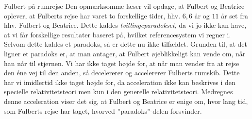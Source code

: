 \begin{opgave}{Fulbert på rumrejse}
    Den opmærksomme læser vil opdage, at Fulbert og Beatrice oplever, at Fulberts rejse har varet to forskellige tider, hhv. $6,6$ år og $11$ år set fra hhv. Fulbert og Beatrice. Dette kaldes \emph{tvillingeparadokset}, da vi jo ikke kan have, at vi får forskellige resultater baseret på, hvilket referencesystem vi regner i. Selvom dette kaldes et paradoks, så er dette nu ikke tilfældet. Grunden til, at det ligner et paradoks er, at man antager, at Fulbert øjeblikkeligt kan vende om, når han når til stjernen. Vi har ikke taget højde for, at når man vender fra at rejse den éne vej til den anden, så decelererer og accelererer Fulberts rumskib. Dette har vi imidlertid ikke taget højde for, da acceleration ikke kan beskrives i den specielle relativitetsteori men kun i den generelle relativitetsteori. Medregnes denne acceleration viser det sig, at Fulbert og Beatrice er enige om, hvor lang tid, som Fulberts rejse har taget, hvorved ''paradoks''-delen forsvinder.
\end{opgave}


